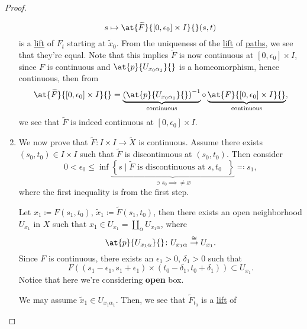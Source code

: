 \begin{proof}
\begin{enumerate}[(1)]
\[			      s\mapsto \at{\widetilde{F}}{[0, \epsilon _0]\times I}{}(s, t)
		      \]
		      is a \hyperref[def:lift]{lift} of \(F_{t} \) starting at \(\widetilde{x} _0\). From the uniqueness of the
		      \hyperref[def:lift]{lift} of \hyperref[def:path]{paths}, we see that they're equal. Note that this implies
		      \(\widetilde{F} \) is now continuous at \([0, \epsilon _0]\times I\), since \(F\) is continuous and \(\at{p}{U_{x_0 \alpha _1}}{}\) is a homeomorphism, hence continuous, then from
		      \[
			      \at{\widetilde{F} }{[0, \epsilon _0]\times I}{}
			      = \underbrace{\left(\at{p}{U_{x_0 \alpha _1}}{} \right)^{-1}}_{\text{continuous} }
			      \circ \underbrace{\vphantom{\left(\at{p}{U_{x_0 \alpha _1}}{} \right)^{-1}}\at{F}{[0, \epsilon _0]\times I}{}}_{\text{continuous}},
		      \]
		      we see that \(\widetilde{F} \) is indeed continuous at \([0, \epsilon _0]\times I\).
		\item We now prove that \(\widetilde{F} \colon I\times I\to \widetilde{X} \) is continuous. Assume there exists \((s_0, t_0)\in I\times I\) such that \(\widetilde{F} \) is
		      discontinuous at \((s_0, t_0)\). Then consider
		      \[
			      0 < \epsilon _0\leq \inf \underbrace{\left\{s\mid \widetilde{F} \text{ is discontinuous at \(s, t_0\) } \right\}}_{\ni s_0 \implies \neq \varnothing} \eqqcolon s_1,
		      \]
		      where the first inequality is from the first step.
		      \begin{figure}[H]
			      \centering
			      \label{fig:pf:col:lec14-6}
		      \end{figure}
		      Let \(x_1\coloneqq F(s_1, t_0)\), \(\widetilde{x} _1\coloneqq \widetilde{F} (s_1, t_0)\), then there exists an open neighborhood \(U_{x_1}\) in \(X\) such that
		      \(x_1\in U_{x_1} = \coprod_\alpha U_{x_1 \alpha }\), where
		      \[
			      \at{p}{U_{x_1 \alpha }}{}\colon U_{x_1 \alpha }\overset{\cong }{\to }U_{x_1}.
		      \]
		      Since \(F\) is continuous, there exists an \(\epsilon _1> 0\), \(\delta _1> 0\) such that
		      \[
			      F\left((s_1 - \epsilon _1, s_1 + \epsilon _1) \times (t_{0}-\delta _1, t_0 + \delta _1 )\right) \subset U_{x_1}.
		      \]
		      Notice that here we're considering \textbf{open} box.
		      \begin{figure}[H]
			      \centering
			      \label{fig:pf:col:lec14-7}
		      \end{figure}
		      We may assume \(\widetilde{x} _1\in U_{x_1 \alpha _1}\). Then, we see that \(\widetilde{F} _{t_0}\) is a \hyperref[def:lift]{lift} of

\end{enumerate}
\end{proof}
